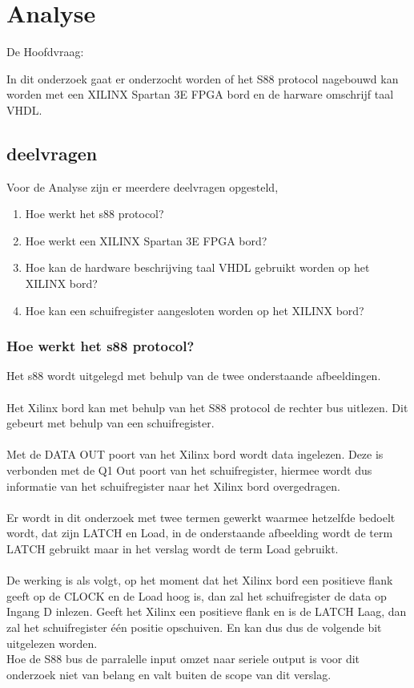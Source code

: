 \chapter{Analyse}
De Hoofdvraag:

In dit onderzoek gaat er onderzocht worden of het S88 protocol nagebouwd kan worden met een XILINX Spartan 3E FPGA bord en de harware omschrijf taal VHDL.
\section{deelvragen}
Voor de Analyse zijn er meerdere deelvragen opgesteld,

\begin{enumerate}
	\item Hoe werkt het s88 protocol?
	\item Hoe werkt een XILINX Spartan 3E FPGA bord?
	\item Hoe kan de hardware beschrijving taal VHDL gebruikt worden op het XILINX bord?
	\item Hoe kan een schuifregister aangesloten worden op het XILINX bord?
\end{enumerate}

\subsection{Hoe werkt het s88 protocol?}
Het s88 wordt uitgelegd met behulp van de twee onderstaande afbeeldingen.
\\\\
Het Xilinx bord kan met behulp van het S88 protocol de rechter bus uitlezen. Dit gebeurt met behulp van een schuifregister.
\\\\
Met de DATA OUT poort van het Xilinx bord wordt data ingelezen. Deze is verbonden met de Q1 Out poort van het schuifregister, hiermee wordt dus informatie van het schuifregister naar het Xilinx bord overgedragen.
\\\\
Er wordt in dit onderzoek met twee termen gewerkt waarmee hetzelfde bedoelt wordt, dat zijn LATCH en Load, in de onderstaande afbeelding wordt de term LATCH gebruikt maar in het verslag wordt de term Load gebruikt.\\\\


De werking is als volgt, op het moment dat het Xilinx bord een positieve flank geeft op de CLOCK en de Load hoog is, dan zal het schuifregister de data op Ingang D inlezen. Geeft het Xilinx een positieve flank en is de LATCH Laag, dan zal het schuifregister één positie opschuiven. En kan dus dus de volgende bit uitgelezen worden.\\
Hoe de S88 bus de parralelle input omzet naar seriele output is voor dit onderzoek niet van belang en valt buiten de scope van dit verslag.	
\\ 

